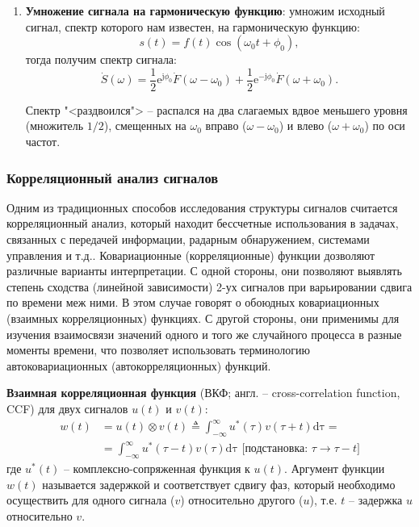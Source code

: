 \documentclass[12pt,a4paper]{article}
\begin{document}
\begin{enumerate}
\item \textbf{Умножение сигнала на гармоническую функцию}: умножим исходный сигнал, спектр которого нам известен, на гармоническую функцию:
\begin{equation}
\nonumber
s\left(t\right)=f\left(t\right)\cos\left(\omega_0 t+\phi_0\right),
\end{equation}
тогда получим спектр сигнала:
\begin{equation}
\dot{S}\left(\omega\right)=\frac{1}{2}\mathrm{e}^{\mathrm{j}\phi_0}\dot{F}\left(\omega-\omega_0\right)+\frac{1}{2}\mathrm{e}^{-\mathrm{j}\phi_0}\dot{F}\left(\omega+\omega_0\right).
\end{equation}

Спектр "<раздвоился"> -- распался на два слагаемых вдвое меньшего уровня (множитель $1/2$), смещенных на $\omega_0$ вправо ($\omega-\omega_0$) и влево ($\omega+\omega_0$) по оси частот.
\end{enumerate}

\subsubsection{Корреляционный анализ сигналов}

Одним из традиционных способов исследования структуры сигналов считается корреляционный анализ, который находит бессчетные использования в задачах, связанных с передачей информации, радарным обнаружением, системами управления и т.д.. Ковариационные (корреляционные) функции дозволяют различные варианты интерпретации. С одной стороны, они позволяют выявлять степень сходства (линейной зависимости) 2-ух сигналов при варьировании сдвига по времени меж ними. В этом случае говорят о обоюдных ковариационных (взаимных корреляционных) функциях. С другой стороны, они применимы для изучения взаимосвязи значений одного и того же случайного процесса в разные моменты времени, что позволяет использовать терминологию автоковариационных (автокорреляционных) функций.

\textbf{Взаимная корреляционная функция}  (ВКФ; англ. -- cross-correla\-tion function, CCF) для двух сигналов $u\left(t\right)$ и $v\left(t\right)$:
\begin{equation}
\nonumber
\begin{split}
  w\left(t\right)&=u\left(t\right)\otimes v\left(t\right)\triangleq\int_{-\infty}^{\infty}{u^*\left(\tau\right)v\left(\tau +t\right)\mathrm{d\tau}}= \\
  &=\int_{-\infty}^{\infty}{u^*\left(\tau-t\right)v\left(\tau\right)\mathrm{d\tau}} \text{ [подстановка: $\tau\rightarrow\tau-t$]}
\end{split}
\end{equation}
где $u^*\left(t\right)$ -- комплексно-сопряженная функция к $u\left(t\right)$. Аргумент функции $w\left(t\right)$ называется задержкой и соответствует сдвигу фаз, который необходимо осуществить для одного сигнала ($v$) относительно другого ($u$), т.е. $t$ -- задержка $u$ относительно $v$.
\end{document}
